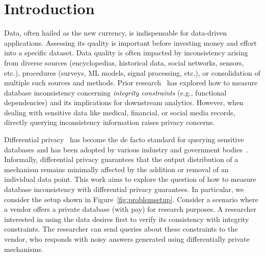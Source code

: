 
\section{Introduction}\label{sec:intro}


Data, often hailed as the new currency, is indispensable for data-driven applications.  Assessing its quality is important before investing money and effort into a specific dataset. Data quality is often impacted by inconsistency arising from diverse sources (encyclopedias, historical data, social networks, sensors, etc.), procedures (surveys, ML models, signal processing, etc.), or consolidation of multiple such sources and methods. Prior research~\cite{thimm2017compliance, parisi2019inconsistency, LivshitsKTIKR21} has explored how to measure database inconsistency concerning \emph{integrity constraints} (e.g., functional dependencies) and its implications for downstream analytics. However, when dealing with sensitive data like medical, financial, or social media records, directly querying inconsistency information raises privacy concerns.

Differential privacy~\cite{dwork2006calibrating} has become the de facto standard for querying sensitive databases and has been adopted by various industry and government bodies~\cite{abowd2018us,erlingsson2014rappor,ding2017collecting}. 
Informally, differential privacy guarantees that the output distribution of a mechanism remains minimally affected by the addition or removal of an individual data point. This work aims to explore the question of how to measure database inconsistency with differential privacy guarantees. In particular, we consider the setup shown in Figure~\ref{fig:problemsetup}. Consider a scenario where a vendor offers a private database (with pay) for research purposes.
A researcher interested in using the data desires first to verify its consistency with integrity constraints. The researcher can send queries about these constraints to the vendor, who responds with noisy answers generated using differentially private mechanisms.


